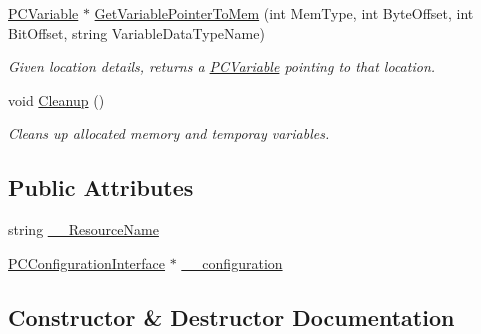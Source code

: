 \begin{DoxyCompactItemize}
\item 
\hyperlink{classpc__emulator_1_1PCVariable}{P\+C\+Variable} $\ast$ \hyperlink{classpc__emulator_1_1PCResourceInterface_aea5cc784e9e3ec2825bd525f4e7130ef}{Get\+Variable\+Pointer\+To\+Mem} (int Mem\+Type, int Byte\+Offset, int Bit\+Offset, string Variable\+Data\+Type\+Name)
\begin{DoxyCompactList}\small\item\em Given location details, returns a \hyperlink{classpc__emulator_1_1PCVariable}{P\+C\+Variable} pointing to that location. \end{DoxyCompactList}\item 
void \hyperlink{classpc__emulator_1_1PCResourceInterface_ac4ddba7e1d117374b040ad3c675087d4}{Cleanup} ()\hypertarget{classpc__emulator_1_1PCResourceInterface_ac4ddba7e1d117374b040ad3c675087d4}{}\label{classpc__emulator_1_1PCResourceInterface_ac4ddba7e1d117374b040ad3c675087d4}

\begin{DoxyCompactList}\small\item\em Cleans up allocated memory and temporay variables. \end{DoxyCompactList}\end{DoxyCompactItemize}
\subsection*{Public Attributes}
\begin{DoxyCompactItemize}
\item 
string \hyperlink{classpc__emulator_1_1PCResourceInterface_ad37ccb9da92a97e34a51fc92f39d191d}{\+\_\+\+\_\+\+Resource\+Name}
\item 
\hyperlink{classpc__emulator_1_1PCConfigurationInterface}{P\+C\+Configuration\+Interface} $\ast$ \hyperlink{classpc__emulator_1_1PCResourceInterface_a43cf1319d3500c46f211c8e649424503}{\+\_\+\+\_\+configuration}
\end{DoxyCompactItemize}


\subsection{Constructor \& Destructor Documentation}

